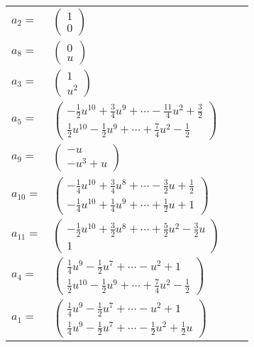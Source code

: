 \documentclass[1p]{elsarticle_modified}
\theoremstyle{definition}
\begin{document}
\begin{tabular}{m{7pt} m{180pt} m{7pt} m{180pt} }
\flushright $a_{2}=$&$\begin{pmatrix}1\\0\end{pmatrix}$ \\
\flushright $a_{8}=$&$\begin{pmatrix}0\\u\end{pmatrix}$ \\
\flushright $a_{3}=$&$\begin{pmatrix}1\\u^2\end{pmatrix}$ \\
\flushright $a_{5}=$&$\begin{pmatrix}-\frac{1}{2} u^{10}+\frac{3}{4} u^9+\cdots-\frac{11}{4} u^2+\frac{3}{2}\\\frac{1}{2} u^{10}-\frac{1}{2} u^9+\cdots+\frac{7}{4} u^2-\frac{1}{2}\end{pmatrix}$ \\
\flushright $a_{9}=$&$\begin{pmatrix}- u\\- u^3+u\end{pmatrix}$ \\
\flushright $a_{10}=$&$\begin{pmatrix}-\frac{1}{4} u^{10}+\frac{3}{4} u^8+\cdots-\frac{3}{2} u+\frac{1}{2}\\-\frac{1}{4} u^{10}+\frac{1}{4} u^9+\cdots+\frac{1}{2} u+1\end{pmatrix}$ \\
\flushright $a_{11}=$&$\begin{pmatrix}-\frac{1}{2} u^{10}+\frac{3}{2} u^8+\cdots+\frac{5}{2} u^2-\frac{3}{2} u\\1\end{pmatrix}$ \\
\flushright $a_{4}=$&$\begin{pmatrix}\frac{1}{4} u^9-\frac{1}{2} u^7+\cdots- u^2+1\\\frac{1}{2} u^{10}-\frac{1}{2} u^9+\cdots+\frac{7}{4} u^2-\frac{1}{2}\end{pmatrix}$ \\
\flushright $a_{1}=$&$\begin{pmatrix}\frac{1}{4} u^9-\frac{1}{2} u^7+\cdots- u^2+1\\\frac{1}{4} u^9-\frac{1}{2} u^7+\cdots-\frac{1}{2} u^2+\frac{1}{2} u\end{pmatrix}$ \\

\end{tabular}
\end{document}

